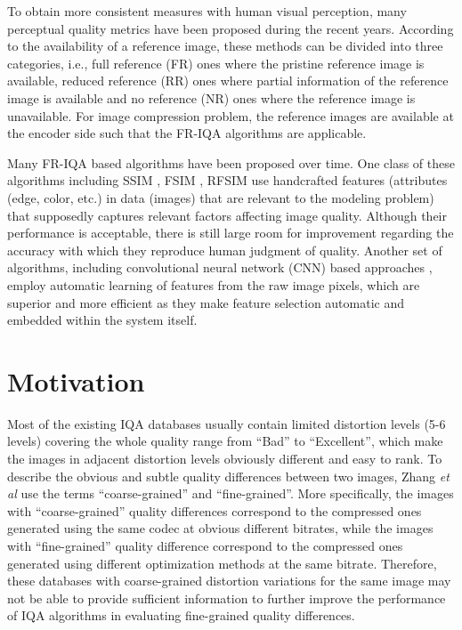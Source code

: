 To obtain more consistent measures with human visual perception, many perceptual quality metrics have been proposed
during the recent years. 
According to the availability of a
reference image, these methods can be divided into three
categories, i.e., full reference (FR) ones where the pristine
reference image is available, reduced reference (RR) ones
where partial information of the reference image is available
and no reference (NR) ones where the reference image is
unavailable. 
For image compression problem, the reference images are available at the encoder side such that the FR-IQA
algorithms are applicable.

Many FR-IQA based algorithms have been proposed over time. One class of these
algorithms including SSIM \cite{Wang2012}, FSIM \cite{Zhang2011}, RFSIM \cite{Zhang2010} use handcrafted features (attributes (edge, color, etc.) in data (images) that are relevant to the
modeling problem) that supposedly captures relevant factors affecting image quality. 
Although their performance is acceptable, there is still large room for improvement regarding the accuracy with which they reproduce human judgment of quality. 
Another set of algorithms, including convolutional neural network
(CNN) based approaches \cite{Bosse2018,Kang2015}, employ automatic learning of features from the
raw image pixels, which are superior and more efficient as they make feature selection automatic and embedded within the system itself.

\section{Motivation}

Most of the existing IQA
databases usually contain limited distortion levels (5-6 levels)
covering the whole quality range from \enquote{Bad} to \enquote{Excellent},
which make the images in adjacent distortion levels obviously
different and easy to rank. 
To describe the obvious and subtle quality differences between two images, Zhang \textit{et al} \cite{Zhang2019} use
the terms \enquote{coarse-grained} and \enquote{fine-grained}.
More specifically, the images with \enquote{coarse-grained} quality differences correspond to the compressed ones generated using the same codec at obvious different bitrates, while the images with \enquote{fine-grained} quality difference correspond to the compressed ones generated using
different optimization methods at the same bitrate. 
Therefore, these databases with coarse-grained distortion variations
for the same image may not be able to provide sufficient
information to further improve the performance of IQA algorithms in evaluating fine-grained quality differences. 

